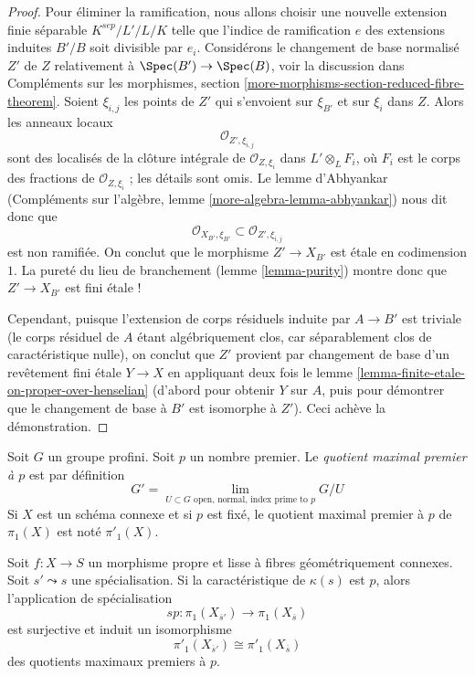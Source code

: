 \begin{proof}
\medskip\noindent
Pour éliminer la ramification, nous allons choisir une nouvelle extension finie
séparable $K^{sep}/L'/L/K$ telle que l'indice de ramification
$e$ des extensions induites $B'/B$ soit divisible par $e_i$.
Considérons le changement de base normalisé $Z'$ de $Z$ relativement à
$\Spec(B') \to \Spec(B)$, voir la discussion dans
Compléments sur les morphismes, section \ref{more-morphisms-section-reduced-fibre-theorem}.
Soient $\xi_{i, j}$ les points de $Z'$ qui s'envoient sur $\xi_{B'}$
et sur $\xi_i$ dans $Z$. Alors les anneaux locaux
$$
\mathcal{O}_{Z', \xi_{i, j}}
$$
sont des localisés de la clôture intégrale de $\mathcal{O}_{Z, \xi_i}$
dans $L' \otimes_L F_i$, où $F_i$ est le corps des fractions de
$\mathcal{O}_{Z, \xi_i}$ ; les détails sont omis. Le lemme d'Abhyankar
(Compléments sur l'algèbre, lemme \ref{more-algebra-lemma-abhyankar})
nous dit donc que
$$
\mathcal{O}_{X_{B'}, \xi_{B'}} \subset \mathcal{O}_{Z', \xi_{i, j}}
$$
est non ramifiée. On conclut que le morphisme $Z' \to X_{B'}$
est \'etale en codimension $1$. La pureté du
lieu de branchement (lemme \ref{lemma-purity})
montre donc que $Z' \to X_{B'}$ est fini \'etale !

\medskip\noindent
Cependant, puisque l'extension de corps résiduels induite par $A \to B'$
est triviale (le corps résiduel de $A$ étant algébriquement clos,
car séparablement clos de caractéristique nulle),
on conclut que $Z'$ provient par changement de base d'un revêtement fini \'etale
$Y \to X$ en appliquant deux fois le
lemme \ref{lemma-finite-etale-on-proper-over-henselian}
(d'abord pour obtenir $Y$ sur $A$, puis pour démontrer que
le changement de base à $B'$ est isomorphe à $Z'$).
Ceci achève la démonstration.
\end{proof}

\noindent
Soit $G$ un groupe profini. Soit $p$ un nombre premier.
Le {\it quotient maximal premier à $p$} est par définition
$$
G' = \lim_{U \subset G\text{ open, normal, index prime to }p} G/U
$$
Si $X$ est un schéma connexe et si $p$ est fixé, le quotient maximal
premier à $p$ de $\pi_1(X)$ est noté $\pi'_1(X)$.

\begin{theorem}
\label{theorem-specialization-map-isomorphism-prime-to-p}
Soit $f : X \to S$ un morphisme propre et lisse à fibres géométriquement
connexes. Soit $s' \leadsto s$ une spécialisation.
Si la caractéristique de $\kappa(s)$ est $p$, alors l'application de
spécialisation
$$
sp : \pi_1(X_{\overline{s}'}) \to \pi_1(X_{\overline{s}})
$$
est surjective et induit un isomorphisme
$$
\pi'_1(X_{\overline{s}'}) \cong \pi'_1(X_{\overline{s}})
$$
des quotients maximaux premiers à $p$.
\end{theorem}

